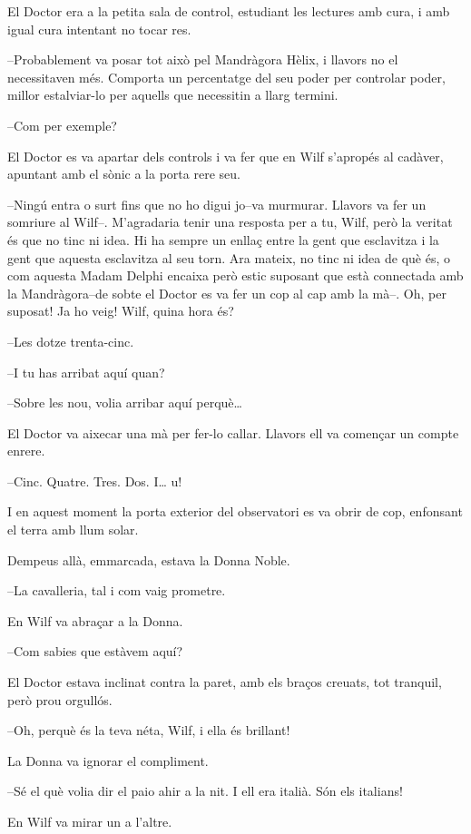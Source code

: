 El Doctor era a la petita sala de control, estudiant les lectures amb
cura, i amb igual cura intentant no tocar res.

--Probablement va posar tot això pel Mandràgora Hèlix, i llavors no el
necessitaven més. Comporta un percentatge del seu poder per controlar
poder, millor estalviar-lo per aquells que necessitin a llarg termini.

--Com per exemple?

El Doctor es va apartar dels controls i va fer que en Wilf s'apropés al
cadàver, apuntant amb el sònic a la porta rere seu.

--Ningú entra o surt fins que no ho digui jo--va murmurar. Llavors va
fer un somriure al Wilf--. M'agradaria tenir una resposta per a tu,
Wilf, però la veritat és que no tinc ni idea. Hi ha sempre un enllaç
entre la gent que esclavitza i la gent que aquesta esclavitza al seu
torn. Ara mateix, no tinc ni idea de què és, o com aquesta Madam Delphi
encaixa però estic suposant que està connectada amb la Mandràgora--de
sobte el Doctor es va fer un cop al cap amb la mà--. Oh, per suposat! Ja
ho veig! Wilf, quina hora és?

--Les dotze trenta-cinc.

--I tu has arribat aquí quan?

--Sobre les nou, volia arribar aquí perquè\ldots{}

El Doctor va aixecar una mà per fer-lo callar. Llavors ell va començar
un compte enrere.

--Cinc. Quatre. Tres. Dos. I\ldots{} u!

I en aquest moment la porta exterior del observatori es va obrir de cop,
enfonsant el terra amb llum solar.

Dempeus allà, emmarcada, estava la Donna Noble.

--La cavalleria, tal i com vaig prometre.

En Wilf va abraçar a la Donna.

--Com sabies que estàvem aquí?

El Doctor estava inclinat contra la paret, amb els braços creuats, tot
tranquil, però prou orgullós.

--Oh, perquè és la teva néta, Wilf, i ella és brillant!

La Donna va ignorar el compliment.

--Sé el què volia dir el paio ahir a la nit. I ell era italià. Són els
italians!

En Wilf va mirar un a l'altre.

